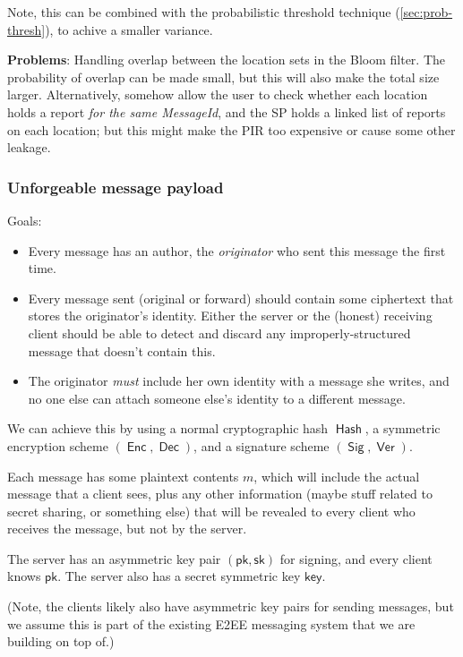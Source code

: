 \documentclass[letterpaper,12pt]{article}
\DeclareMathOperator{\Hash}{\textsf{Hash}}
\DeclareMathOperator{\Enc}{\textsf{Enc}}
\DeclareMathOperator{\Dec}{\textsf{Dec}}
\DeclareMathOperator{\Sig}{\textsf{Sig}}
\DeclareMathOperator{\Ver}{\textsf{Ver}}
\newcommand{\pubkeyserv}{\textsf{pk}}
\newcommand{\seckeyserv}{\textsf{sk}}
\newcommand{\symkeyserv}{\textsf{key}}
\begin{document}
Note, this can be combined with the probabilistic threshold technique
(\cref{sec:prob-thresh}), to achive a smaller variance.

\textbf{Problems}: Handling overlap between the location sets in the
Bloom filter. The probability of overlap can be made small, but this
will also make the total size larger. Alternatively, somehow allow the
user to check whether each location holds a report \emph{for the same
MessageId}, and the SP holds a linked list of reports on each location;
but this might make the PIR too expensive or cause some other leakage.

\subsubsection{Unforgeable message payload}\label{sec:unforgeable}

Goals:
\begin{itemize}
  \item
    Every message has an author, the \emph{originator} who sent this
    message the first time.
  \item
    Every message sent (original or forward) should contain some
    ciphertext that stores the originator's identity. Either the server
    or the (honest) receiving client should be able to detect and
    discard any improperly-structured message that doesn't contain this.
  \item
    The originator \emph{must} include her own identity with a message
    she writes, and no one else can attach someone else's identity to
    a different message.
\end{itemize}

We can achieve this by using a normal cryptographic hash $\Hash$, a
symmetric encryption scheme $(\Enc,\Dec)$, and a signature scheme
$(\Sig,\Ver)$.

Each message has some plaintext
contents $m$, which will include the actual message that a client sees,
plus any other information (maybe stuff related to secret sharing, or
something else) that will be revealed to every client who receives the
message, but not by the server.

The server has an asymmetric key pair $(\pubkeyserv,\seckeyserv)$
for signing, and every client knows $\pubkeyserv$.
The server also has a secret symmetric key $\symkeyserv$.

(Note, the clients likely also have asymmetric key pairs for sending
messages, but we assume this is part of the existing E2EE messaging
system that we are building on top of.)
\end{document}
